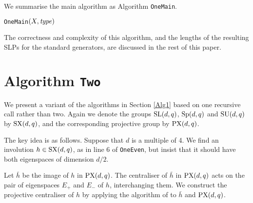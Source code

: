 \documentclass[12pt]{article}
\def\SL{{\rm SL}}
\def\Sp{{\rm Sp}}
\def\SU{{\rm SU}}
\def\SX{{\rm SX}}
\def\PX{{\rm PX}}
\begin{document}
We summarise the main algorithm as Algorithm {\tt OneMain}. 

\begin{algorithm2e}[ht]
\caption{\tt OneMain$(X,{\it type})$}
\label{alg1:main}

\end{algorithm2e}

The correctness and complexity of this algorithm, 
and the lengths of the resulting SLPs for the 
standard generators, are discussed in the rest
of this paper.

\section{Algorithm {\tt Two}} 
\label{Alg2}

We present a variant of the algorithms in Section \ref{Alg1} based on  
one recursive call rather than two. Again we denote 
the groups $\SL(d,q)$, $\Sp(d,q)$
and $\SU(d,q)$ by $\SX(d,q)$, and the corresponding projective group
by $\PX(d,q)$.

The key idea is as follows. Suppose that $d$ is a multiple of 4.  
We find an involution $h \in \SX (d, q)$, as in line 6 of {\tt OneEven},
but insist that it should have both eigenspaces of dimension $d/2$. 

Let $\bar{h}$ be the image of $h$ in $\PX(d,q)$.
The centraliser of $\bar{h}$ in $\PX(d,q)$
acts on the pair of eigenspaces $E_+$ and $E_-$ of $h$, 
interchanging them. We construct the
projective centraliser of $h$ by applying the algorithm 
of \cite{Bray} to $\bar{h}$ and $\PX(d, q)$.
\end{document}
